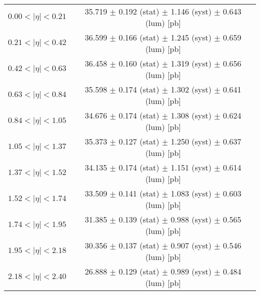 \begin{tabular}{lc}
\hline
$0.00 < |\eta| <0.21$          & 35.719 $\pm$ 0.192 (stat) $\pm$ 1.146 (syst) $\pm$ 0.643 (lum) [pb]  \\
$0.21 < |\eta| <0.42$          & 36.599 $\pm$ 0.166 (stat) $\pm$ 1.245 (syst) $\pm$ 0.659 (lum) [pb]  \\
$0.42 < |\eta| <0.63$          & 36.458 $\pm$ 0.160 (stat) $\pm$ 1.319 (syst) $\pm$ 0.656 (lum) [pb]  \\
$0.63 < |\eta| <0.84$          & 35.598 $\pm$ 0.174 (stat) $\pm$ 1.302 (syst) $\pm$ 0.641 (lum) [pb]  \\
$0.84 < |\eta| <1.05$          & 34.676 $\pm$ 0.174 (stat) $\pm$ 1.308 (syst) $\pm$ 0.624 (lum) [pb]  \\
$1.05 < |\eta| <1.37$          & 35.373 $\pm$ 0.127 (stat) $\pm$ 1.250 (syst) $\pm$ 0.637 (lum) [pb]  \\
$1.37 < |\eta| <1.52$          & 34.135 $\pm$ 0.174 (stat) $\pm$ 1.151 (syst) $\pm$ 0.614 (lum) [pb]  \\
$1.52 < |\eta| <1.74$          & 33.509 $\pm$ 0.141 (stat) $\pm$ 1.083 (syst) $\pm$ 0.603 (lum) [pb]  \\
$1.74 < |\eta| <1.95$          & 31.385 $\pm$ 0.139 (stat) $\pm$ 0.988 (syst) $\pm$ 0.565 (lum) [pb]  \\
$1.95 < |\eta| <2.18$          & 30.356 $\pm$ 0.137 (stat) $\pm$ 0.907 (syst) $\pm$ 0.546 (lum) [pb]  \\
$2.18 < |\eta| <2.40$          & 26.888 $\pm$ 0.129 (stat) $\pm$ 0.989 (syst) $\pm$ 0.484 (lum) [pb]  \\
\hline
\end{tabular}
